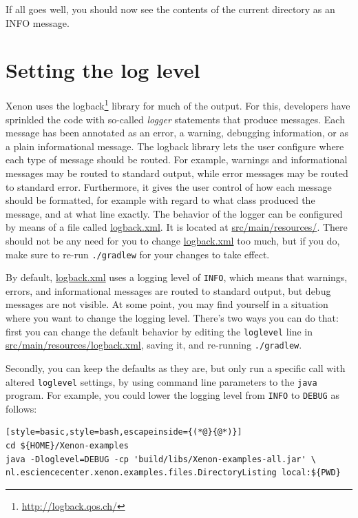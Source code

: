 \documentclass[12pt, a4paper, twoside, openany, titlepage]{book}
\begin{document}
If all goes well, you should now see the contents of the current directory as an INFO message.


\section{Setting the log level}
\label{sec:setting-the-log-level-command-line}

Xenon uses the logback\footnote{\url{http://logback.qos.ch/}} library for much of the output. For this, developers have sprinkled the code with so-called \textit{logger} statements that produce messages. Each message has been annotated as an error, a warning, debugging information, or as a plain informational message. The logback library lets the user configure where each type of message should be routed. For example, warnings and informational messages may be routed to standard output, while error messages may be routed to standard error. Furthermore, it gives the user control of how each message should be formatted, for example with regard to what class produced the message, and at what line exactly. The behavior of the logger can be configured by means of a file called \url{logback.xml}. It is located at \url{src/main/resources/}. There should not be any need for you to change \url{logback.xml} too much, but if you do, make sure to re-run \texttt{./gradlew} for your changes to take effect.

By default, \url{logback.xml} uses a logging level of \texttt{INFO}, which means that warnings, errors, and informational messages are routed to standard output, but debug messages are not visible. At some point, you may find yourself in a situation where you want to change the logging level. There's two ways you can do that: first you can change the default behavior by editing the \texttt{loglevel} line in \url{src/main/resources/logback.xml}, saving it, and re-running \texttt{./gradlew}.

Secondly, you can keep the defaults as they are, but only run a specific call with altered \texttt{loglevel} settings, by using command line parameters to the \texttt{java} program. For example, you could lower the logging level from \texttt{INFO} to \texttt{DEBUG} as follows:

\begin{lstlisting}[style=basic,style=bash,escapeinside={(*@}{@*)}]
cd ${HOME}/Xenon-examples
java -Dloglevel=DEBUG -cp 'build/libs/Xenon-examples-all.jar' \
nl.esciencecenter.xenon.examples.files.DirectoryListing local:${PWD}
\end{lstlisting} %
\end{document}
